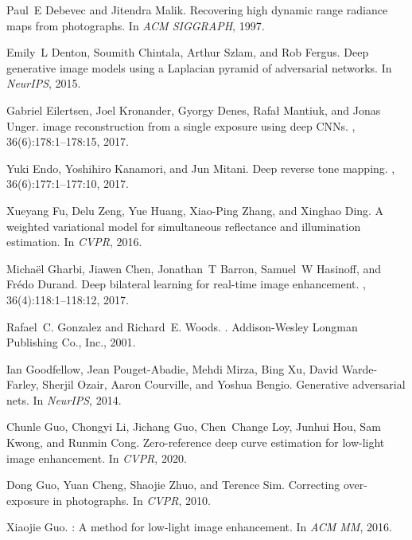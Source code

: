 \documentclass[final]{cvpr}
\begin{document}
{\begin{thebibliography}{10}
Paul~E Debevec and Jitendra Malik.
\newblock Recovering high dynamic range radiance maps from photographs.
\newblock In {\em ACM SIGGRAPH}, 1997.

Emily~L Denton, Soumith Chintala, Arthur Szlam, and Rob Fergus.
\newblock Deep generative image models using a {L}aplacian pyramid of
  adversarial networks.
\newblock In {\em NeurIPS}, 2015.

Gabriel Eilertsen, Joel Kronander, Gyorgy Denes, Rafał Mantiuk, and Jonas
  Unger.
 image reconstruction from a single exposure using deep {CNN}s.
, 36(6):178:1--178:15, 2017.

Yuki Endo, Yoshihiro Kanamori, and Jun Mitani.
\newblock Deep reverse tone mapping.
, 36(6):177:1--177:10, 2017.

Xueyang Fu, Delu Zeng, Yue Huang, Xiao-Ping Zhang, and Xinghao Ding.
\newblock A weighted variational model for simultaneous reflectance and
  illumination estimation.
\newblock In {\em CVPR}, 2016.

Micha{\"e}l Gharbi, Jiawen Chen, Jonathan~T Barron, Samuel~W Hasinoff, and
  Fr{\'e}do Durand.
\newblock Deep bilateral learning for real-time image enhancement.
, 36(4):118:1--118:12, 2017.

Rafael~C. Gonzalez and Richard~E. Woods.
.
\newblock Addison-Wesley Longman Publishing Co., Inc., 2001.

Ian Goodfellow, Jean Pouget-Abadie, Mehdi Mirza, Bing Xu, David Warde-Farley,
  Sherjil Ozair, Aaron Courville, and Yoshua Bengio.
\newblock Generative adversarial nets.
\newblock In {\em NeurIPS}, 2014.

Chunle Guo, Chongyi Li, Jichang Guo, Chen~Change Loy, Junhui Hou, Sam Kwong,
  and Runmin Cong.
\newblock Zero-reference deep curve estimation for low-light image enhancement.
\newblock In {\em CVPR}, 2020.

Dong Guo, Yuan Cheng, Shaojie Zhuo, and Terence Sim.
\newblock Correcting over-exposure in photographs.
\newblock In {\em CVPR}, 2010.

Xiaojie Guo.
: {A} method for low-light image enhancement.
\newblock In {\em ACM MM}, 2016.


\end{thebibliography}}
\end{document}
